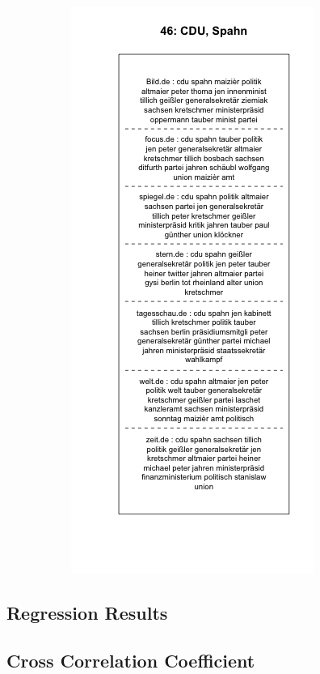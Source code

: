\documentclass[12pt,a4paper,notitlepage]{article}
\begin{document}
\begin{figure}[H]
\begin{center}
\begin{subfigure}[normla]{0.49\textwidth}
		\end{subfigure}
		\begin{subfigure}[normla]{0.49\textwidth}
			\includegraphics[width=\textwidth]{../figs/plotquote46.png}
		\end{subfigure}
	\end{center}
\end{figure}

\subsection{Regression Results}\label{apx_coeff}



\subsection{Cross Correlation Coefficient}

\end{document}
